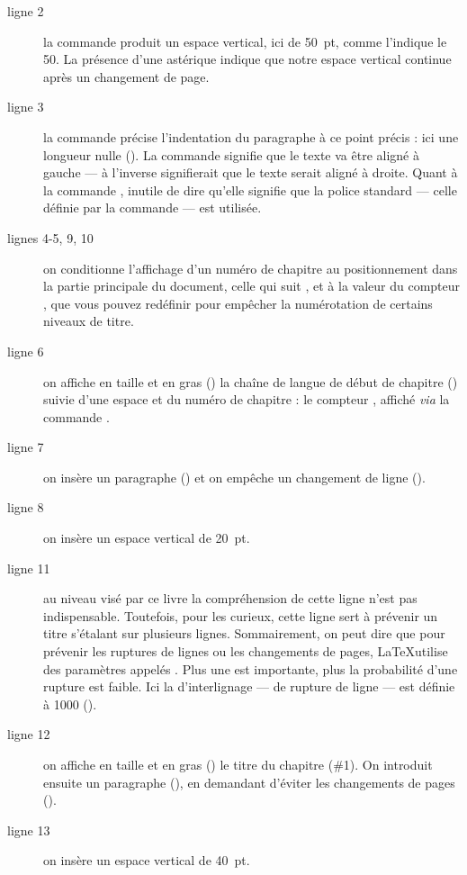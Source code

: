 \begin{description}
\item[ligne 2]la commande   produit un espace vertical, ici de 50~pt, comme l'indique le 50. La présence d'une astérique indique que notre espace vertical continue après un changement de page.
\item[ligne 3]la commande  précise l'indentation du paragraphe à ce point précis : ici une longueur nulle (). La commande  signifie que le texte va être aligné à gauche --- à l'inverse  signifierait que le texte serait aligné à droite. Quant à la commande , inutile de dire qu'elle signifie que la police standard --- celle définie par la commande  --- est utilisée.
\item[lignes 4-5, 9, 10]on conditionne l'affichage d'un numéro de chapitre au positionnement dans la partie principale du document, celle qui suit , et à la valeur du compteur , que vous pouvez redéfinir pour empêcher la numérotation de certains niveaux de titre.
\item[ligne 6]on affiche en taille  et en gras () la chaîne de langue de début de chapitre () suivie d'une espace et du numéro de chapitre : le compteur , affiché \emph{via} la commande .
\item[ligne 7]on insère un paragraphe () et on empêche un changement de ligne ().
\item[ligne 8]on insère un espace vertical de 20~pt.
\item[ligne 11]au niveau visé par ce livre la compréhension de cette ligne n'est pas indispensable. Toutefois, pour les curieux, cette ligne sert à prévenir un titre s'étalant sur plusieurs lignes. Sommairement, on peut dire que pour prévenir les ruptures de lignes ou les changements de pages, \LaTeX utilise des paramètres appelés . Plus une  est importante, plus la probabilité d'une rupture est faible. Ici la  d'interlignage --- de rupture de ligne --- est définie à 1000 (). 
\item[ligne 12]on affiche en taille  et en gras () le titre du chapitre (\#1). On introduit ensuite un paragraphe (), en demandant d'éviter les changements de pages ().
\item[ligne 13]on insère un espace vertical de 40~pt.
\end{description}

